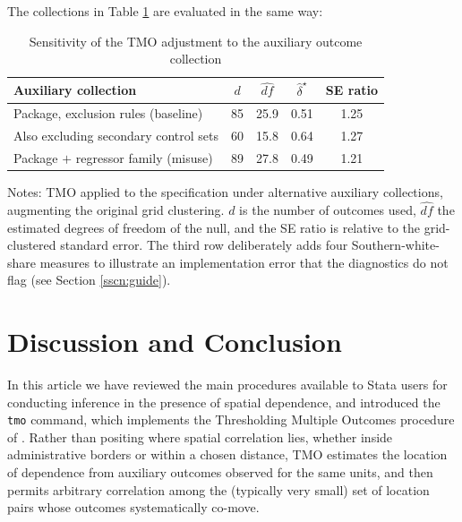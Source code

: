 \documentclass[varwidth,bib]{statapress}
\begin{document}
The collections in Table \ref{tab:bazziylist} are evaluated in the same way:

\begin{stlog}

\end{stlog}

\begin{table}[H]
\centering
\caption{Sensitivity of the TMO adjustment to the auxiliary outcome collection}
\label{tab:bazziylist}
\begin{threeparttable}
\begin{tabular}{lcccc}
\toprule
Auxiliary collection & $d$ & $\widehat{df}$ & $\hat\delta^\star$ & SE ratio \\
\midrule
Package, exclusion rules (baseline)          & 85 & 25.9 & 0.51 & 1.25 \\
Also excluding secondary control sets        & 60 & 15.8 & 0.64 & 1.27 \\
Package $+$ regressor family (misuse)        & 89 & 27.8 & 0.49 & 1.21 \\
\bottomrule
\end{tabular}
\begin{tablenotes}[flushleft]
\setlength{}\scriptsize
\item Notes: TMO applied to the \citet{Bazzietal2023} specification under alternative auxiliary collections, augmenting the original grid clustering.  $d$ is the number of outcomes used, $\widehat{df}$ the estimated degrees of freedom of the null, and the SE ratio is relative to the grid-clustered standard error.  The third row deliberately adds four Southern-white-share measures to illustrate an implementation error that the diagnostics do not flag (see Section \ref{sscn:guide}).
\end{tablenotes}
\end{threeparttable}
\end{table}

\section{Discussion and Conclusion}
\label{scn:discussion}
In this article we have reviewed the main procedures available to Stata users for conducting inference in the presence of spatial dependence, and introduced the {\tt tmo} command, which implements the Thresholding Multiple Outcomes procedure of \citet{Dellavignaetal2025}.  Rather than positing where spatial correlation lies, whether inside administrative borders or within a chosen distance, TMO estimates the location of dependence from auxiliary outcomes observed for the same units, and then permits arbitrary correlation among the (typically very small) set of location pairs whose outcomes systematically co-move.
\end{document}
